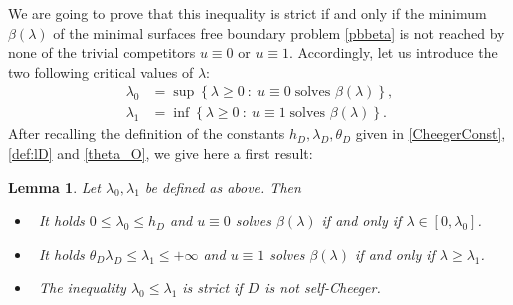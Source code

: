 \documentclass[reqno,11pt]{amsart}
\newtheorem{lemma}[theorem]{Lemma}
\theoremstyle{definition}
\numberwithin{equation}{section}
\newcommand{\RR}{\mathbb{R}}
\newcommand{\1}{{{\bf 1}\kern-0,28em\rm l}}
\def\l{\lambda}
\begin{document}
We are going to prove  that this inequality is strict if and only if the minimum  $\beta(\lambda)$ of the minimal surfaces free boundary problem \eqref{pbbeta}
is not reached by none of the trivial competitors  $u\equiv 0$ or $u\equiv 1$.
Accordingly, let us introduce the two following critical values of $\lambda$:
\begin{align}
\lambda_0 &= \sup \left\{ \lambda\ge 0 \ :\ u\equiv 0 \; \text{solves $\beta(\lambda)$}\right\},\label{def:lambda0} \\
\lambda_1 &= \inf  \left\{ \lambda\ge 0 \ :\ u\equiv 1 \; \text{solves $\beta(\lambda)$}\right\}.\label{def:lambda1}
\end{align}
After recalling the definition of the constants $h_D, \l_D, \theta_D$ given in \eqref{CheegerConst}, \eqref{def:lD} and \eqref{theta_O}, we  give here
a first result:
\begin{lemma} \label{intervals} Let $\l_0,\l_1$ be defined as above. Then
\begin{itemize}
\item [(i)] \ It holds $0\le\l_0 \le h_D$ and $u\equiv 0  $ solves $\beta(\lambda)$ if and only if $\l\in [0,\l_0]$.
\item [(ii)] \ It holds $\theta_D \l_D\le\l_1\le +\infty$ and   $u\equiv 1$  solves $\beta(\lambda)$ if and only if $\l\ge \l_1$.
\item [(iii)] \ The inequality  $\l_0\le\l_1$  is strict if $D$ is not self-Cheeger. 
\end{itemize}

\end{lemma}
\end{document}
